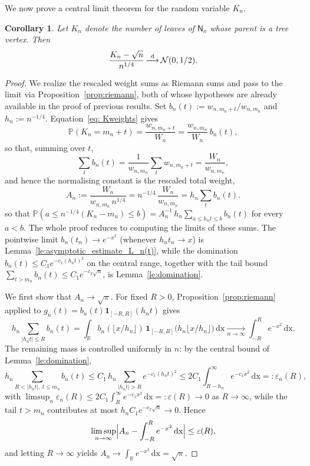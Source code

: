\documentclass[english,11pt]{smfart}
\newcommand{\ndR}{\mathbb{R}}
\newcommand{\Prb}[1]{\mathbb{P}\left(#1\right)}
\newcommand{\convdis}{\,{\buildrel \mathrm{d} \over \longrightarrow}\,}
\newcommand{\cN}{\mathcal{N}}
\newcommand{\mN}{\mathsf{N}}
\newtheorem{corollary}[theorem]{Corollary}
\numberwithin{equation}{section}
\begin{document}
We now prove a central limit theorem for the random variable $K_n$.
\begin{corollary}
	\label{co:ttsize}
	Let $K_n$ denote the number of leaves of $\mN_n$ whose parent is a tree vertex.
	Then
	\[
		\frac{K_n - \sqrt{n}}{n^{1/4}} \convdis \cN(0, 1/2).
	\]
\end{corollary}
\begin{proof}
We realize the rescaled weight sums as Riemann sums and pass to the limit via
Proposition~\ref{prop:riemann}, both of whose hypotheses are already available in the proof of previous results.
Set $b_n(t):=w_{n,m_n+t}/w_{n,m_n}$ and $h_n:=n^{-1/4}$. Equation~\eqref{eq: Kweights} gives
\[
  \Prb{K_n=m_n+t}=\frac{w_{n,m_n+t}}{W_n}=\frac{w_{n,m_n}}{W_n}\,b_n(t),
\]
so that, summing over $t$,
\[
  \sum_{t}b_n(t)=\frac{1}{w_{n,m_n}}\sum_{t}w_{n,m_n+t}=\frac{W_n}{w_{n,m_n}},
\]
and hence the normalising constant is the rescaled total weight,
\[
  A_n:=\frac{W_n}{w_{n,m_n}\,n^{1/4}}
  =n^{-1/4}\,\frac{W_n}{w_{n,m_n}}
  =h_n\sum_{t}b_n(t).
\]
so that
$\Prb{a\le n^{-1/4}(K_n-m_n)\le b}=A_n^{-1}\,h_n\sum_{a\le h_n t\le b}b_n(t)$ for
every $a<b$. The whole proof reduces to computing the limits of these sums. The
pointwise limit $b_n(t_n)\to e^{-x^2}$ (whenever $h_n t_n\to x$)
is Lemma~\ref{le:asymptotic_estimate_L_n(t)}, while the domination
$b_n(t)\le C_1 e^{-c_1(h_n t)^2}$ on the central range, together with the tail
bound $\sum_{t>m_n}b_n(t)\le C_1 e^{-c_2\sqrt n}$, is Lemma~\ref{le:domination}.
\medskip

We first show that $A_n\to\sqrt\pi$. For fixed $R>0$,
Proposition~\ref{prop:riemann} applied to $g_n(t) = b_n(t)\mathbf 1_{[-R,R]}(h_n t)$
gives
\[
  h_n\!\!\sum_{|h_n t|\le R}\!\! b_n(t)
  =\int_{\ndR}b_n(\lfloor x/h_n\rfloor)\,
   \mathbf 1_{[-R,R]}\!\bigl(h_n\lfloor x/h_n\rfloor\bigr)\, \mathrm{dx}
  \xrightarrow[n\to\infty]{}\int_{-R}^{R}e^{-x^2}\, \mathrm{dx} .
\]
The remaining mass is controlled uniformly in $n$: by the central bound of Lemma~\ref{le:domination},
\[
  h_n\!\!\sum_{R<|h_n t|,\ t\le m_n}\!\! b_n(t)
  \le C_1\,h_n\!\!\sum_{|h_n t|>R}\!\! e^{-c_1(h_n t)^2}
  \le 2C_1\!\int_{R-h_n}^{\infty}\!\!e^{-c_1 x^2}\, \mathrm{dx}=:\varepsilon_n(R),
\]
with $\limsup_n\varepsilon_n(R)\le 2C_1\int_{R}^{\infty}e^{-c_1 x^2}\, \mathrm{dx}=:\varepsilon(R)\to0$
as $R\to\infty$, while the tail $t>m_n$ contributes at most
$h_n C_1 e^{-c_2\sqrt n}\to0$. Hence
\[
  \limsup_{n\to\infty}\Bigl|A_n-\int_{-R}^{R}e^{-x^2}\, \mathrm{dx}\Bigr|\le\varepsilon(R),
\]
and letting $R\to\infty$ yields $A_n\to\int_{\mathbb R}e^{-x^2}\, \mathrm{dx}=\sqrt\pi$.
\smallskip


\end{proof}
\end{document}
